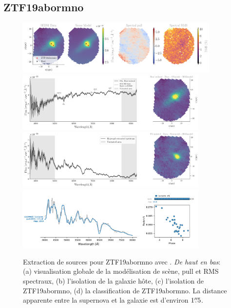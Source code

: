 \documentclass[../main/main.tex]{subfiles}
\begin{document}

\subsection{ZTF19abormno}
\begin{figure}[ht]
  \centering
  \includegraphics[width=0.9\textwidth]{../figures/07_scene/scene_rmspull_ZTF19abormno.png}
  \includegraphics[width=0.85\textwidth]{../figures/07_scene/output_host_ZTF19abormno.png}
  \includegraphics[width=0.85\textwidth]{../figures/07_scene/output_target_ZTF19abormno.png}
  \includegraphics[width=0.85\textwidth]{../figures/07_scene/ZTF19abormno_snid_typing.pdf}
  \caption[Extraction de sources pour ZTF19abormno.]{Extraction de
    sources pour ZTF19abormno avec \hypergal. \emph{De haut en bas}:
    (a) visualisation globale de la modélisation de scène, pull et RMS
    spectraux, (b) l'isolation de la galaxie hôte, (c) l'isolation de
    ZTF19abormno, (d) la classification de ZTF19abormno. La distance apparente entre la
supernova et la galaxie est d'environ $1\overset{\prime\prime}{.}5$.}
  \label{}
\end{figure}
\clearpage
\end{document}
